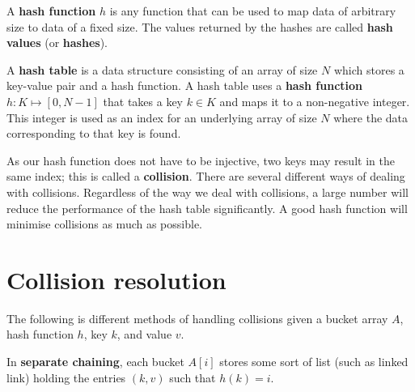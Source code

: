\begin{definition}
	A \textbf{hash function} $h$ is any function that can be used to map data of arbitrary size to data of a fixed size. The values returned by the hashes are called \textbf{hash values} (or \textbf{hashes}).
\end{definition}

\begin{definition}
	A \textbf{hash table} is a data structure consisting of an array of size $N$ which stores a key-value pair and a hash function. A hash table uses a \textbf{hash function} $h : K \mapsto [0, N - 1]$ that takes a key $k \in K$ and maps it to a non-negative integer. This integer is used as an index for an underlying array of size $N$ where the data corresponding to that key is found.
\end{definition}

	As our hash function does not have to be injective, two keys may result in the same index; this is called a \textbf{collision}. There are several different ways of dealing with collisions. Regardless of the way we deal with collisions, a large number will reduce the performance of the hash table significantly. A good hash function will minimise collisions as much as possible.

\section{Collision resolution}

The following is different methods of handling collisions given a bucket array $A$, hash function $h$, key $k$, and value $v$.

\begin{definition}
    In \textbf{separate chaining}, each bucket $A[i]$ stores some sort of list (such as linked link) holding the entries $(k,v)$ such that $h(k)=i$.
\end{definition}

